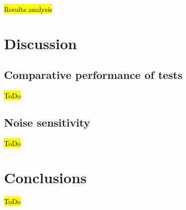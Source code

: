 \documentclass{article}
\begin{document}
\hl{Results analysis}


\section{Discussion}

\subsection{Comparative performance of tests}

\hl{ToDo}

\subsection{Noise sensitivity}

\hl{ToDo}



\section{Conclusions}

\hl{ToDo}



\end{document}
